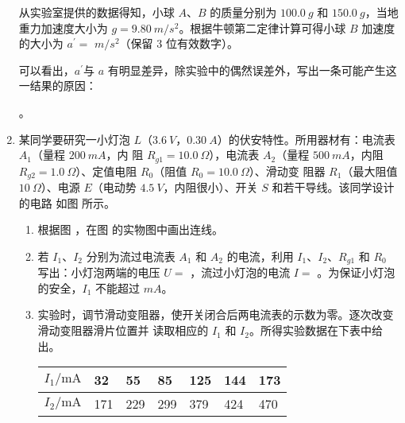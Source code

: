 \begin{enumerate}
从实验室提供的数据得知，小球 $ A $、$ B $ 的质量分别为 $ 100.0 \ g $ 和 $ 150.0 \ g $，当地重力加速度大小为 $ g=9.80 \ m/s^{2} $。根据牛顿第二定律计算可得小球 $ B $ 加速度的大小为 $ a ^{\prime}= $ \underlinegap $m/s^{2} $（保留 $ 3 $ 位有效数字）。

可以看出，$ a ^{\prime} $与 $ a $ 有明显差异，除实验中的偶然误差外，写出一条可能产生这一结果的原因： \hfullline 

\hfullline 。




\newpage
\item
某同学要研究一小灯泡 $ L $（$ 3.6 \ V $，$ 0.30 \ A $）的伏安特性。所用器材有：电流表 $ A_{1} $（量程 $ 200 \ mA $，内
阻 $ R_{g1} =10.0 \ \Omega $），电流表 $ A_{2} $（量程 $ 500 \ mA $，内阻 $ R_{g2} =1.0 \ \Omega $）、定值电阻 $ R_{0} $（阻值 $ R_{0} =10.0 \ \Omega $）、滑动变
阻器 $ R_{1} $（最大阻值 $ 10 \ \Omega $）、电源 $ E $（电动势 $ 4.5 \ V $，内阻很小）、开关 $ S $ 和若干导线。该同学设计的电路
如图  所示。


\begin{enumerate}
\item
根据图  ，在图  的实物图中画出连线。
\begin{figure}[h!]
\centering
\begin{subfigure}{0.4\linewidth}
\centering
 
\caption{}\label{2020:全国2:10a}
\end{subfigure}
\hfil
\begin{subfigure}{0.4\linewidth}
\centering
 
\caption{}\label{2020:全国2:10b}
\end{subfigure}
\end{figure}

\item 
若 $ I_{1} $、$ I_{2} $ 分别为流过电流表 $ A_{1} $ 和 $ A_{2} $ 的电流，利用 $ I_{1} $、$ I_{2} $、$ R_{g1} $ 和 $ R_{0} $ 写出：小灯泡两端的电压 $ U= $ \underlinegap 
，流过小灯泡的电流 $ I= $ \underlinegap 。为保证小灯泡的安全，$ I_{1} $ 不能超过 \underlinegap $ mA $。

\item 
实验时，调节滑动变阻器，使开关闭合后两电流表的示数为零。逐次改变滑动变阻器滑片位置并
读取相应的 $ I_{1} $ 和 $ I_{2} $。所得实验数据在下表中给出。
\begin{table}[h!]
\centering 
\begin{tabular}{|l|l|l|l|l|l|l|}
\hline$I_{1} / \mathrm{mA}$ & 32 & 55 & 85 & 125 & 144 & 173 \\
\hline$I_{2} / \mathrm{mA}$ & 171 & 229 & 299 & 379 & 424 & 470 \\
\hline
\end{tabular}
\end{table} 






\end{enumerate}
\end{enumerate}
